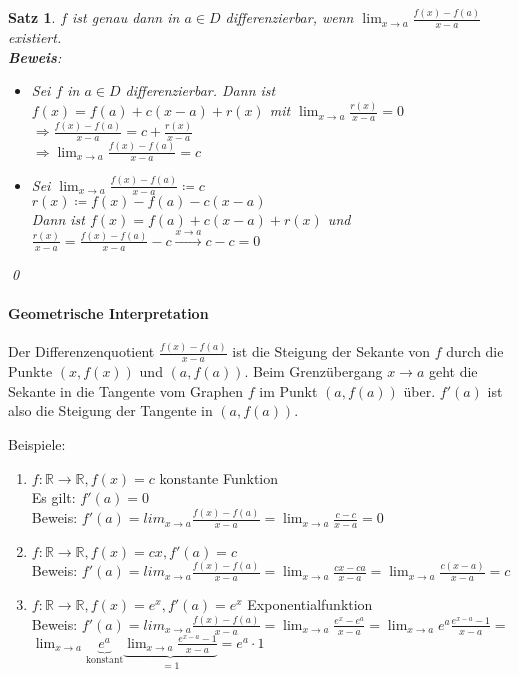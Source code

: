 \documentclass[ngerman,titlepage,twoside, parskip=half*]{scrreprt}
\newcommand*{\R}{\mathbb{R}}
\theoremstyle{plain}
\newtheorem{theorem}{Satz}[section]
\theoremstyle{definition}
\theoremstyle{remark}
\begin{document}
\begin{theorem}
$f$ ist genau dann in $a\in D$ differenzierbar, wenn $\lim_{x\rightarrow a} \frac{f(x)-f(a)}{x-a}$
existiert.\\
\textbf{Beweis}:
\begin{itemize}
  \item["`$\Rightarrow$"'] Sei $f$ in $a\in D$ differenzierbar. Dann ist $f(x)=f(a)+c(x-a)+r(x)$ mit
    $\lim_{x\rightarrow a}\frac{r(x)}{x-a}=0$\\
    $\Rightarrow \frac{f(x)-f(a)}{x-a}=c+\frac{r(x)}{x-a}$\\
    $\Rightarrow \lim_{x\rightarrow a} \frac{f(x)-f(a)}{x-a}=c$
  \item["`$\Leftarrow$"'] Sei $\lim_{x\rightarrow a}
  \frac{f(x)-f(a)}{x-a}\coloneqq c$\\
    $r(x)\coloneqq f(x)-f(a)-c(x-a)$\\
    Dann ist $f(x)=f(a)+c(x-a)+r(x)$ und $\frac{r(x)}{x-a}=
    \frac{f(x)-f(a)}{x-a}-c\stackrel{x\rightarrow a}{\rightarrow}c-c=0$
\end{itemize}
\qed
\end{theorem}

\paragraph{Geometrische Interpretation}
Der Differenzenquotient
$\frac{f(x)-f(a)}{x-a}$ ist die Steigung der Sekante
 von $f$ durch die Punkte $(x,f(x))$ und
$(a,f(a))$. Beim Grenzübergang $x\rightarrow a$ geht die Sekante in
die Tangente vom Graphen $f$ im Punkt $(a,f(a))$
über. $f'(a)$ ist also die Steigung der Tangente in $(a,f(a))$.

Beispiele:
\begin{enumerate}[(1)]
\item $f\colon\R\rightarrow\R, f(x)=c$ konstante Funktion\\
  Es gilt: $f'(a)=0$\\
  Beweis: $f'(a)=lim_{x\rightarrow
    a}\frac{f(x)-f(a)}{x-a}=\lim_{x\rightarrow a}\frac{c-c}{x-a}=0$
\item $f\colon\R\rightarrow\R, f(x)=cx, f'(a)=c$\\
  Beweis: $f'(a)=lim_{x\rightarrow
    a}\frac{f(x)-f(a)}{x-a}=\lim_{x\rightarrow a}\frac{cx-ca}{x-a}
  =\lim_{x\rightarrow a}\frac{c(x-a)}{x-a}=c$
\item $f\colon\R\rightarrow\R, f(x)=e^x, f'(a)=e^x$ Exponentialfunktion\\
  Beweis: $f'(a)=lim_{x\rightarrow
    a}\frac{f(x)-f(a)}{x-a}=\lim_{x\rightarrow a}\frac{e^x-e^a}{x-a}=
  \lim_{x\rightarrow a}e^a\frac{e^{x-a}-1}{x-a}=$\\
  $\lim_{x\rightarrow a}\underbrace{e^a}_{\text{konstant}}
  \underbrace{\lim_{x\rightarrow
      a}\frac{e^{x-a}-1}{x-a}}_{=1}=e^a\cdot 1$
 \end{enumerate}
\end{document}
